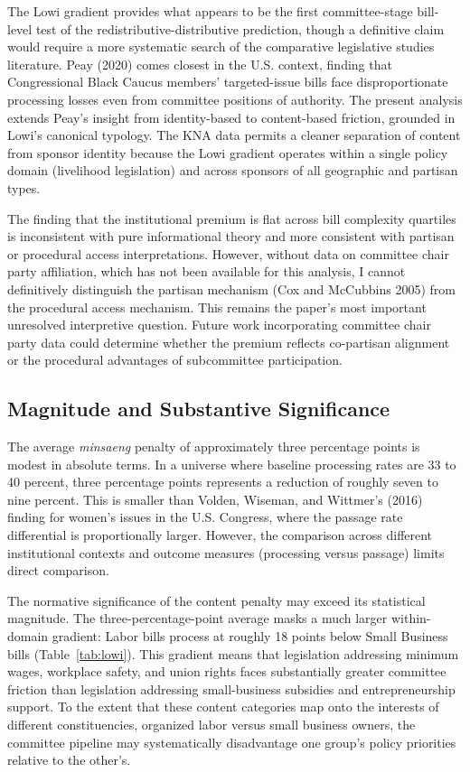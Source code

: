 \documentclass[11pt]{article}
\begin{document}
The Lowi gradient provides what appears to be the first committee-stage bill-level test of the redistributive-distributive prediction, though a definitive claim would require a more systematic search of the comparative legislative studies literature. Peay (2020) comes closest in the U.S. context, finding that Congressional Black Caucus members' targeted-issue bills face disproportionate processing losses even from committee positions of authority. The present analysis extends Peay's insight from identity-based to content-based friction, grounded in Lowi's canonical typology. The KNA data permits a cleaner separation of content from sponsor identity because the Lowi gradient operates within a single policy domain (livelihood legislation) and across sponsors of all geographic and partisan types.

The finding that the institutional premium is flat across bill complexity quartiles is inconsistent with pure informational theory and more consistent with partisan or procedural access interpretations. However, without data on committee chair party affiliation, which has not been available for this analysis, I cannot definitively distinguish the partisan mechanism (Cox and McCubbins 2005) from the procedural access mechanism. This remains the paper's most important unresolved interpretive question. Future work incorporating committee chair party data could determine whether the premium reflects co-partisan alignment or the procedural advantages of subcommittee participation.

\subsection{Magnitude and Substantive Significance}\label{sec:magnitude}

The average \emph{minsaeng} penalty of approximately three percentage points is modest in absolute terms. In a universe where baseline processing rates are 33 to 40 percent, three percentage points represents a reduction of roughly seven to nine percent. This is smaller than Volden, Wiseman, and Wittmer's (2016) finding for women's issues in the U.S. Congress, where the passage rate differential is proportionally larger. However, the comparison across different institutional contexts and outcome measures (processing versus passage) limits direct comparison.

The normative significance of the content penalty may exceed its statistical magnitude. The three-percentage-point average masks a much larger within-domain gradient: Labor bills process at roughly 18 points below Small Business bills (Table~\ref{tab:lowi}). This gradient means that legislation addressing minimum wages, workplace safety, and union rights faces substantially greater committee friction than legislation addressing small-business subsidies and entrepreneurship support. To the extent that these content categories map onto the interests of different constituencies, organized labor versus small business owners, the committee pipeline may systematically disadvantage one group's policy priorities relative to the other's.
\end{document}
